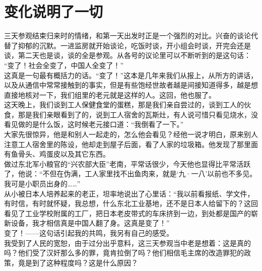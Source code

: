 \fancyhead[RO]{\thepage} %
\fancyhead[LE]{\thepage} %
\chapter*{变化说明了一切}
三天参观结束归来时的情绪，和第一天出发时正是一个强烈的对比。兴奋的谈论代替了抑郁的沉默。一进监房就开始谈论，吃饭时谈，开小组会时谈，开完会还是谈，第二天也是谈，谈的全是参观。从各号的议论里可以不断听到的是这句话：\\

“变了！社会全变了，中国人全变了！”\\

这真是一句最有概括力的话。“变了！”这本是几年来我们从报上，从所方的讲话，以及从通信中常常接触到的事实，但是有些饱经世故者越是间接知道得多，越是想直接地核对一下，我们组里的老元就是这样的人。这回，他也服了。\\

这天晚上，我们谈到工人保健食堂的蛋糕，那是我们亲自尝过的，谈到工人的伙食，那是我们亲眼看到了的，说到工人宿舍的瓦斯灶，有人说可惜只看见烧水，没看见做的是什么饭，这时候老元接口道：“我倒看了一下。”\\

大家先很惊异，他是和别人一起走的，怎么他会看见？经他一说才明白，原来别人注意工人宿舍里的陈设，他却走到屋子后面，看了人家的垃圾箱。他发现了那里面有鱼骨头、鸡蛋皮以及其它东西。\\

做过东北军小粮官的“兴农部大臣”老南，平常话很少，今天他也显得比平常活跃了，他说：“不但在伪满，工人家里找不出鱼肉来，就是‘九·一八’以前也不多见。我可是小职员出身的……”\\

从小被日本人培养起来的老正，坦率地说出了心里话：“我以前看报纸、学文件，有时信，有时就怀疑，我总想，什么东北工业基地，还不是日本人给留下的？这回看见了工业学校附属的工厂，把日本老皮带式的车床挤到一边，到处都是国产的崭新设备，我才相信真是中国人翻了身。这真是变了！”\\

变了！——这句话引起我的共鸣，我另有自己的感受。\\

我受到了人民的宽恕，由于过分出乎意料，这三天参观当中老是想着：这是真的吗？他们受了汉奸那么多的罪，竟肯拉倒了吗？他们相信毛主席的改造罪犯的政策，竟是到了这种程度吗？这是什么原因？\\

